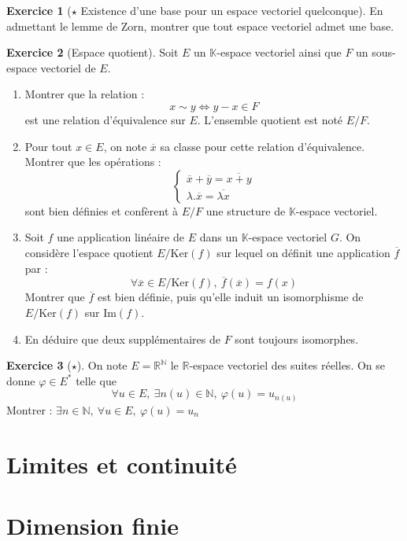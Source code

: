 \documentclass[french]{book}
\newcommand{\N}{\mathbb{N}}
\newcommand{\R}{\mathbb{R}}
\newcommand{\K}{\mathbb{K}}
\newcommand{\st}{^*}
\renewcommand{\ker}{\text{Ker}}
\newcommand{\im}{\text{Im}}
\theoremstyle{definition}
\newtheorem{ex}{Exercice}[chapter]
\theoremstyle{theorem}
\theoremstyle{remark}
\begin{document}
\begin{ex}[$\star$ Existence d'une base pour un espace vectoriel quelconque]
	En admettant le lemme de Zorn, montrer que tout espace vectoriel admet une base.
\end{ex}

\begin{ex}[Espace quotient]
	Soit $E$ un $\K$-espace vectoriel ainsi que $F$ un sous-espace vectoriel de $E$.
	\begin{enumerate}
		\item Montrer que la relation : $$x\sim y\iff y-x\in F$$ est une relation d'équivalence sur $E$. L'ensemble quotient est noté $E/F$.
		\item Pour tout $x\in E$, on note $\overline{x}$ sa classe pour cette relation d'équivalence. Montrer que les opérations : $$\begin{cases}
			\overline{x}+\overline{y}=\overline{x+y} \\
			\lambda.\overline{x}=\overline{\lambda x}
		\end{cases}$$ sont bien définies et confèrent à $E/F$ une structure de $\K$-espace vectoriel.
		\item Soit $f$ une application linéaire de $E$ dans un $\K$-espace vectoriel $G$. On considère l'espace quotient $E/\ker(f)$ sur lequel on définit une application $\overline{f}$ par : $$\forall \overline{x}\in E/\ker(f),\ \overline{f}(\overline{x})=f(x)$$ Montrer que $\overline{f}$ est bien définie, puis qu'elle induit un isomorphisme de $E/\ker(f)$ sur $\im(f)$.
		\item En déduire que deux supplémentaires de $F$ sont toujours isomorphes.
	\end{enumerate}
\end{ex}

\begin{ex}[$\star$]
	On note $E=\R^\N$ le $\R$-espace vectoriel des suites réelles. On se donne $\varphi\in E\st$ telle que $$\forall u\in E,\ \exists n(u)\in \N,\ \varphi(u)=u_{n(u)}$$ Montrer : $\exists n\in\N,\ \forall u\in E,\ \varphi(u)=u_n$
\end{ex}

\chapter{Limites et continuité}



\chapter{Dimension finie}
\end{document}
